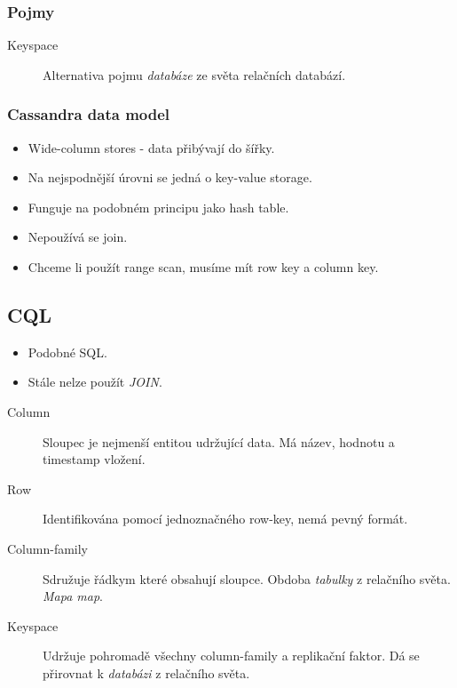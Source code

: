 \documentclass{article}
\begin{document}
    \subsubsection{Pojmy}
      \begin{description}
        \item[Keyspace] Alternativa pojmu \emph{databáze} ze světa relačních databází.
      \end{description}

    \subsubsection{Cassandra data model}
      \begin{itemize}
        \item Wide-column stores - data přibývají do šířky.
        \item Na nejspodnější úrovni se jedná o key-value storage.
        \item Funguje na podobném principu jako hash table.
        \item Nepoužívá se join.
        \item Chceme li použít range scan, musíme mít row key a column key.
      \end{itemize}

    \subsection{CQL}
      \begin{itemize}
        \item Podobné SQL.
        \item Stále nelze použít \emph{JOIN}.
      \end{itemize}


    \begin{description}
      \item[Column] Sloupec je nejmenší entitou udržující data. Má název, hodnotu a timestamp vložení.
      \item[Row] Identifikována pomocí jednoznačného row-key, nemá pevný formát.
      \item[Column-family] Sdružuje řádkym které obsahují sloupce. Obdoba \emph{tabulky} z relačního světa. \emph{Mapa map}.
      \item[Keyspace] Udržuje pohromadě všechny column-family a replikační faktor. Dá se přirovnat k \emph{databázi} z relačního světa.
    \end{description}
\end{document}
